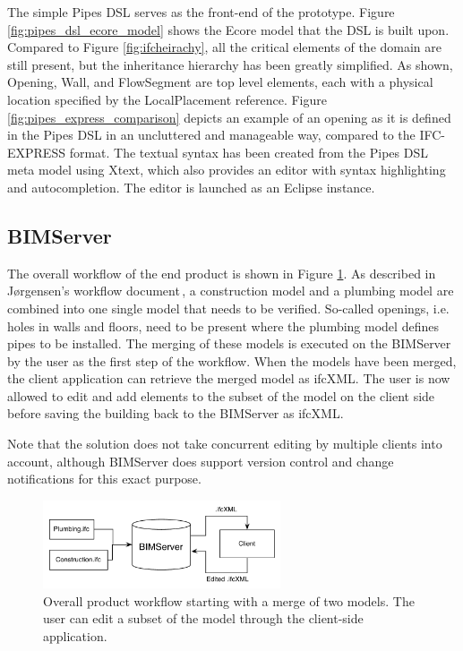 The simple Pipes DSL serves as the front-end of the prototype. Figure \ref{fig:pipes_dsl_ecore_model} shows the Ecore model that the DSL is built upon. Compared to Figure \ref{fig:ifcheirachy}, all the critical elements of the domain are still present, but the inheritance hierarchy has been greatly simplified. As shown, Opening, Wall, and FlowSegment are top level elements, each with a physical location specified by the LocalPlacement reference. Figure \ref{fig:pipes_express_comparison} depicts an example of an opening as it is defined in the Pipes DSL in an uncluttered and manageable way, compared to the IFC-EXPRESS format. The textual syntax has been created from the Pipes DSL meta model using Xtext, which also provides an editor with syntax highlighting and autocompletion. The editor is launched as an Eclipse instance.

\subsection{BIMServer}
The overall workflow of the end product is shown in Figure \ref{fig:overall_product_workflow}. As described in J\o rgensen's workflow document\,\cite{jorgensen12}, a construction model and a plumbing model are combined into one single model that needs to be verified. So-called openings, i.e. holes in walls and floors, need to be present where the plumbing model defines pipes to be installed. The merging of these models is executed on the BIMServer by the user as the first step of the workflow. When the models have been merged, the client application can retrieve the merged model as ifcXML. The user is now allowed to edit and add elements to the subset of the model on the client side before saving the building back to the BIMServer as ifcXML.

Note that the solution does not take concurrent editing by multiple clients into account, although BIMServer does support version control and change notifications for this exact purpose.

\begin{figure}[h]
    \centering
        \includegraphics[width=70mm]{images/CompleteWorkflow.pdf}
    \caption{Overall product workflow starting with a merge of two models. The user can edit a subset of the model through the client-side application.}
    \label{fig:overall_product_workflow}
\end{figure}

